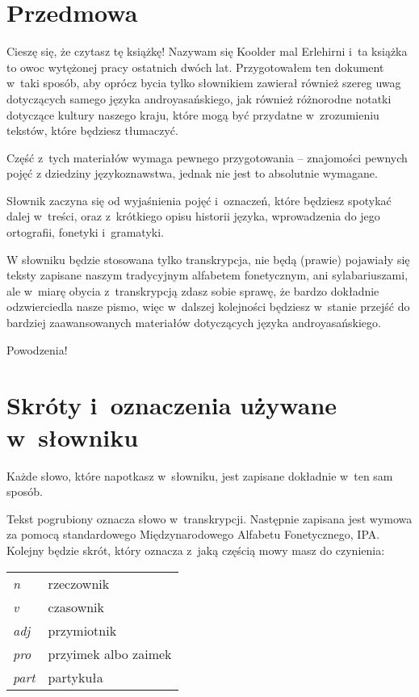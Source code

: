 \newpage

\section{Przedmowa}

\begin{spacing}{1.1}

Cieszę się, że czytasz tę książkę! Nazywam się Koolder mal Erlehirni i~ta
książka to owoc wytężonej pracy ostatnich dwóch lat. Przygotowałem ten dokument
w~taki sposób, aby oprócz bycia tylko słownikiem zawierał również szereg uwag
dotyczących samego języka androyasańskiego, jak również różnorodne notatki
dotyczące kultury naszego kraju, które mogą być przydatne w~zrozumieniu tekstów,
które będziesz tłumaczyć.

Część z~tych materiałów wymaga pewnego przygotowania -- znajomości pewnych pojęć
z dziedziny językoznawstwa, jednak nie jest to absolutnie wymagane.

Słownik zaczyna się od wyjaśnienia pojęć i~oznaczeń, które będziesz spotykać
dalej w~treści, oraz z~krótkiego opisu historii języka, wprowadzenia do jego
ortografii, fonetyki i~gramatyki.

W słowniku będzie stosowana tylko transkrypcja, nie będą (prawie) pojawiały się
teksty zapisane naszym tradycyjnym alfabetem fonetycznym, ani sylabariuszami,
ale w~miarę obycia z~transkrypcją zdasz sobie sprawę, że bardzo dokładnie
odzwierciedla nasze pismo, więc w~dalszej kolejności będziesz w~stanie przejść
do bardziej zaawansowanych materiałów dotyczących języka androyasańskiego.

\bigskip

Powodzenia!

\section[Skróty i~oznaczenia]{Skróty i~oznaczenia używane w~słowniku}

Każde słowo, które napotkasz w~słowniku, jest zapisane dokładnie w~ten sam
sposób.

Tekst pogrubiony oznacza słowo w~transkrypcji. Następnie zapisana jest wymowa za
pomocą standardowego Międzynarodowego Alfabetu Fonetycznego, IPA. Kolejny będzie
skrót, który oznacza z~jaką częścią mowy masz do czynienia:

\begin{table}[h]
\begin{tabular}{ll}
\emph{n}    & rzeczownik           \\
\emph{v}    & czasownik            \\
\emph{adj}  & przymiotnik          \\
\emph{pro}  & przyimek albo zaimek \\
\emph{part} & partykuła           
\end{tabular}
\end{table}


\end{spacing}
